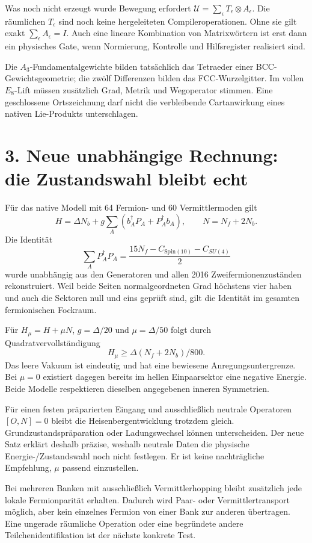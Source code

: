 \begin{grenze}{Was noch nicht erzeugt wurde}
Bewegung erfordert $\mathcal U=\sum_\epsilon T_\epsilon\otimes A_\epsilon$. Die räumlichen $T_\epsilon$ sind noch keine hergeleiteten Compileroperationen. Ohne sie gilt exakt $\sum_\epsilon A_\epsilon=I$. Auch eine lineare Kombination von Matrixwörtern ist erst dann ein physisches Gate, wenn Normierung, Kontrolle und Hilfsregister realisiert sind.
\end{grenze}

Die $A_3$-Fundamentalgewichte bilden tatsächlich das Tetraeder einer BCC-Gewichtsgeometrie; die zwölf Differenzen bilden das FCC-Wurzelgitter. Im vollen $E_8$-Lift müssen zusätzlich Grad, Metrik und Wegoperator stimmen. Eine geschlossene Ortszeichnung darf nicht die verbleibende Cartanwirkung eines nativen Lie-Produkts unterschlagen.

\chapter*{3. Neue unabhängige Rechnung: die Zustandswahl bleibt echt}
Für das native Modell mit 64 Fermion- und 60 Vermittlermoden gilt
\[
H=\Delta N_b+g\sum_A(b_A^\dagger P_A+P_A^\dagger b_A),\qquad N=N_f+2N_b.
\]
Die Identität
\[
\sum_A P_A^\dagger P_A=\frac{15N_f-C_{\mathrm{Spin}(10)}-C_{SU(4)}}2
\]
wurde unabhängig aus den Generatoren und allen 2016 Zweifermionenzuständen rekonstruiert. Weil beide Seiten normalgeordneten Grad höchstens vier haben und auch die Sektoren null und eins geprüft sind, gilt die Identität im gesamten fermionischen Fockraum.

Für $H_\mu=H+\mu N$, $g=\Delta/20$ und $\mu=\Delta/50$ folgt durch Quadratvervollständigung
\[
\boxed{H_\mu\ge\Delta(N_f+2N_b)/800.}
\]
Das leere Vakuum ist eindeutig und hat eine bewiesene Anregungsuntergrenze. Bei $\mu=0$ existiert dagegen bereits im hellen Einpaarsektor eine negative Energie. Beide Modelle respektieren dieselben angegebenen inneren Symmetrien.

Für einen festen präparierten Eingang und ausschließlich neutrale Operatoren $[O,N]=0$ bleibt die Heisenbergentwicklung trotzdem gleich. Grundzustandspräparation oder Ladungswechsel können unterscheiden. Der neue Satz erklärt deshalb präzise, weshalb neutrale Daten die physische Energie-/Zustandswahl noch nicht festlegen. Er ist keine nachträgliche Empfehlung, $\mu$ passend einzustellen.

Bei mehreren Banken mit ausschließlich Vermittlerhopping bleibt zusätzlich jede lokale Fermionparität erhalten. Dadurch wird Paar- oder Vermittlertransport möglich, aber kein einzelnes Fermion von einer Bank zur anderen übertragen. Eine ungerade räumliche Operation oder eine begründete andere Teilchenidentifikation ist der nächste konkrete Test.


